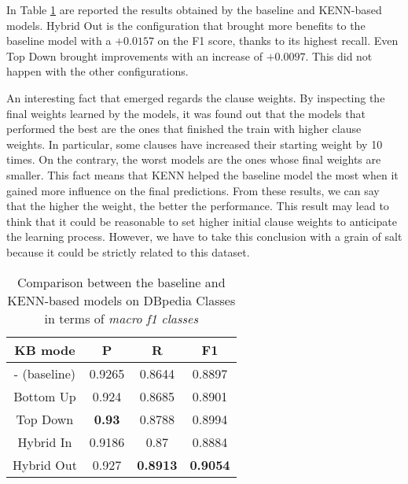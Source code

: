 In Table \ref{tab:performance_dbpedia} are reported the results obtained by the baseline and KENN-based models. Hybrid Out is the configuration that brought more benefits to the baseline model with a $+0.0157$ on the F1 score, thanks to its highest recall. Even Top Down brought improvements with an increase of $+0.0097$. This did not happen with the other configurations.

An interesting fact that emerged regards the clause weights. By inspecting the final weights learned by the models, it was found out that the models that performed the best are the ones that finished the train with higher clause weights. In particular, some clauses have increased their starting weight by 10 times. On the contrary, the worst models are the ones whose final weights are smaller. This fact means that KENN helped the baseline model the most when it gained more influence on the final predictions. From these results, we can say that the higher the weight, the better the performance. This result may lead to think that it could be reasonable to set higher initial clause weights to anticipate the learning process. However, we have to take this conclusion with a grain of salt because it could be strictly related to this dataset.

\begin{table}[H]
\centering
\caption{Comparison between the baseline and KENN-based models on DBpedia Classes in terms of \textit{macro f1 classes}}
\label{tab:performance_dbpedia}
\begin{tabular}{|c|ccc|}
\hline
\textbf{KB mode} & \multicolumn{1}{c|}{\textbf{P}} & \multicolumn{1}{c|}{\textbf{R}} & \textbf{F1}     \\ \hline
- (baseline)       & 0.9265                          & 0.8644                          & 0.8897          \\ \hline
Bottom Up      & 0.924                           & 0.8685                          & 0.8901          \\ \hline
Top Down       & \textbf{0.93}                   & 0.8788                          & 0.8994          \\ \hline
Hybrid In      & 0.9186                          & 0.87                            & 0.8884          \\ \hline
Hybrid Out     & 0.927                           & \textbf{0.8913}                 & \textbf{0.9054} \\ \hline
\end{tabular}
\end{table}
